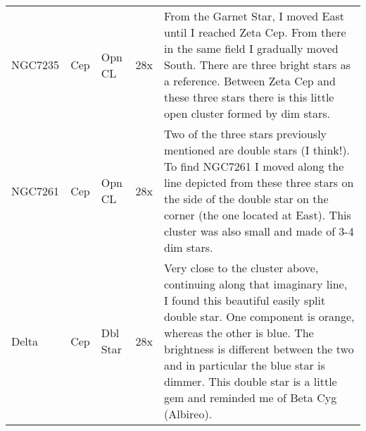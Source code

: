 \begin{longtable}{ p{0.7in}  p{0.3in}  p{0.6in}  p{0.9in}  p{5.8in} }
NGC7235 & Cep & Opn CL & 28x & From the Garnet Star, I moved East until I reached Zeta Cep. From there in the same field I gradually moved South. There are three bright stars as a reference. Between Zeta Cep and these three stars there is this little open cluster formed by dim stars.  \\ 
NGC7261 & Cep & Opn CL & 28x & Two of the three stars previously mentioned are double stars (I think!). To find NGC7261 I moved along the line depicted from these three stars on the side of the double star on the corner (the one located at East). This cluster was also small and made of 3-4 dim stars.  \\ 
Delta & Cep & Dbl Star & 28x & Very close to the cluster above, continuing along that imaginary line, I found this beautiful easily split double star. One component is orange, whereas the other is blue. The brightness is different between the two and in particular the blue star is dimmer. This double star is a little gem and reminded me of Beta Cyg (Albireo). \\ 
\hline 
\end{longtable} 
